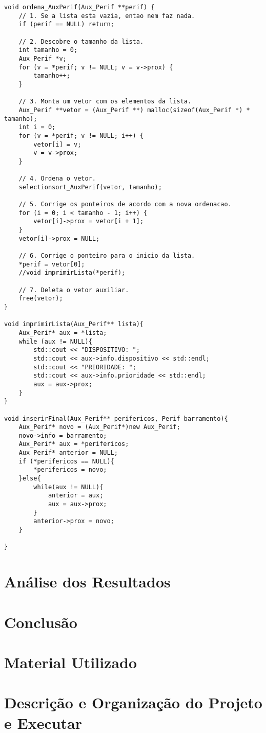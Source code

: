 \documentclass[12pt, oneside,a4paper, brazil]{abntex2}
\begin{document}
\begin{lstlisting}
void ordena_AuxPerif(Aux_Perif **perif) {
    // 1. Se a lista esta vazia, entao nem faz nada.
    if (perif == NULL) return;

    // 2. Descobre o tamanho da lista.
    int tamanho = 0;
    Aux_Perif *v;
    for (v = *perif; v != NULL; v = v->prox) {
        tamanho++;
    }

    // 3. Monta um vetor com os elementos da lista.
    Aux_Perif **vetor = (Aux_Perif **) malloc(sizeof(Aux_Perif *) * tamanho);
    int i = 0;
    for (v = *perif; v != NULL; i++) {
        vetor[i] = v;
        v = v->prox;
    }

    // 4. Ordena o vetor.
    selectionsort_AuxPerif(vetor, tamanho);

    // 5. Corrige os ponteiros de acordo com a nova ordenacao.
    for (i = 0; i < tamanho - 1; i++) {
        vetor[i]->prox = vetor[i + 1];
    }
    vetor[i]->prox = NULL;

    // 6. Corrige o ponteiro para o inicio da lista.
    *perif = vetor[0];
    //void imprimirLista(*perif);

    // 7. Deleta o vetor auxiliar.
    free(vetor);
}

void imprimirLista(Aux_Perif** lista){
	Aux_Perif* aux = *lista;
	while (aux != NULL){
		std::cout << "DISPOSITIVO: ";
		std::cout << aux->info.dispositivo << std::endl;
		std::cout << "PRIORIDADE: ";
		std::cout << aux->info.prioridade << std::endl;
		aux = aux->prox;
	}
}

void inserirFinal(Aux_Perif** perifericos, Perif barramento){
	Aux_Perif* novo = (Aux_Perif*)new Aux_Perif;
	novo->info = barramento;
	Aux_Perif* aux = *perifericos;
	Aux_Perif* anterior = NULL;
	if (*perifericos == NULL){
		*perifericos = novo;
	}else{
		while(aux != NULL){
			anterior = aux;
			aux = aux->prox;
		}
		anterior->prox = novo;
	}

}
\end{lstlisting}

\chapter{Análise dos Resultados}
\chapter{Conclusão}
\chapter{Material Utilizado}
\chapter{Descrição e Organização do Projeto e Executar}
\end{document}
